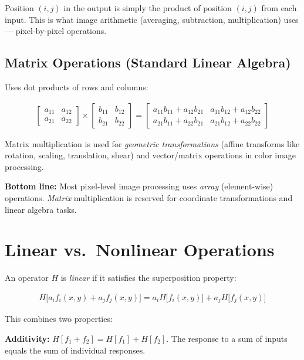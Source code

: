 \documentclass[11pt]{article}
\begin{document}
Position $(i,j)$ in the output is simply the product of position $(i,j)$ from each input. This is what image arithmetic (averaging, subtraction, multiplication) uses --- pixel-by-pixel operations.

\subsection{Matrix Operations (Standard Linear Algebra)}

Uses dot products of rows and columns:

\begin{align}
    \begin{bmatrix} a_{11} & a_{12} \\ a_{21} & a_{22} \end{bmatrix}
    \times
    \begin{bmatrix} b_{11} & b_{12} \\ b_{21} & b_{22} \end{bmatrix}
    =
    \begin{bmatrix} a_{11}b_{11}+a_{12}b_{21} & a_{11}b_{12}+a_{12}b_{22} \\ a_{21}b_{11}+a_{22}b_{21} & a_{21}b_{12}+a_{22}b_{22} \end{bmatrix}
\end{align}

Matrix multiplication is used for \textit{geometric transformations} (affine transforms like rotation, scaling, translation, shear) and vector/matrix operations in color image processing.

\textbf{Bottom line:} Most pixel-level image processing uses \textit{array} (element-wise) operations. \textit{Matrix} multiplication is reserved for coordinate transformations and linear algebra tasks.

\section{Linear vs.\ Nonlinear Operations}

An operator $H$ is \textit{linear} if it satisfies the superposition property:

\begin{align}
    H\big[a_i f_i(x,y) + a_j f_j(x,y)\big] = a_i H\big[f_i(x,y)\big] + a_j H\big[f_j(x,y)\big]
\end{align}

This combines two properties:

\textbf{Additivity:} $H[f_1 + f_2] = H[f_1] + H[f_2]$. The response to a sum of inputs equals the sum of individual responses.
\end{document}
